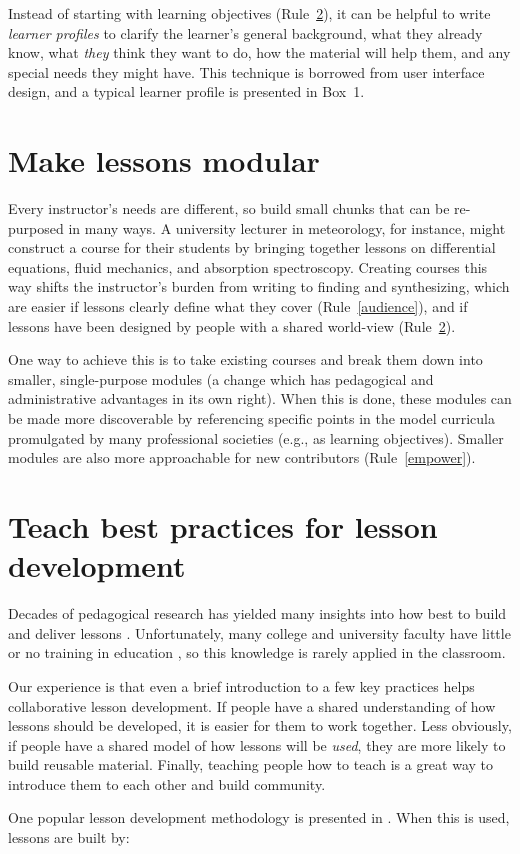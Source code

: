 \documentclass[10pt,letterpaper]{article}
\newcommand{\rulemajor}[2]{\section{#1}\label{#2}}
\newcommand{\ruleref}[1]{Rule~\ref{#1}}
\begin{document}
Instead of starting with learning objectives (\ruleref{practices}),
it can be helpful to write \emph{learner profiles} to clarify
the learner's general background,
what they already know,
what \emph{they} think they want to do,
how the material will help them,
and any special needs they might have.
This technique is borrowed from user interface design,
and a typical learner profile is presented in Box~1.

\rulemajor{Make lessons modular}{modular}

Every instructor's needs are different,
so build small chunks that can be re-purposed in many ways.
A university lecturer in meteorology,
for instance,
might construct a course for their students by bringing together lessons on differential equations,
fluid mechanics,
and absorption spectroscopy.
Creating courses this way shifts the instructor's burden from writing to finding and synthesizing,
which are easier if lessons clearly define what they cover (\ruleref{audience}),
and if lessons have been designed by people with a shared world-view (\ruleref{practices}).

One way to achieve this is to take existing courses and break them down into smaller, single-purpose modules
(a change which has pedagogical and administrative advantages in its own right).
When this is done,
these modules can be made more discoverable
by referencing specific points in the model curricula promulgated by many professional societies
(e.g., as learning objectives).
Smaller modules are also more approachable for new contributors (\ruleref{empower}).

\rulemajor{Teach best practices for lesson development}{practices}

Decades of pedagogical research has yielded many insights into
how best to build and deliver lessons \cite{hlw}.
Unfortunately,
many college and university faculty have little or no training in education \cite{brownell},
so this knowledge is rarely applied in the classroom.

Our experience is that even a brief introduction to a few key practices
helps collaborative lesson development.
If people have a shared understanding of how lessons should be developed,
it is easier for them to work together.
Less obviously,
if people have a shared model of how lessons will be \emph{used},
they are more likely to build reusable material.
Finally,
teaching people how to teach is a great way to introduce them to each other and build community.

One popular lesson development methodology is presented in \cite{wiggins-mctighe}.
When this is used,
lessons are built by:
\end{document}
